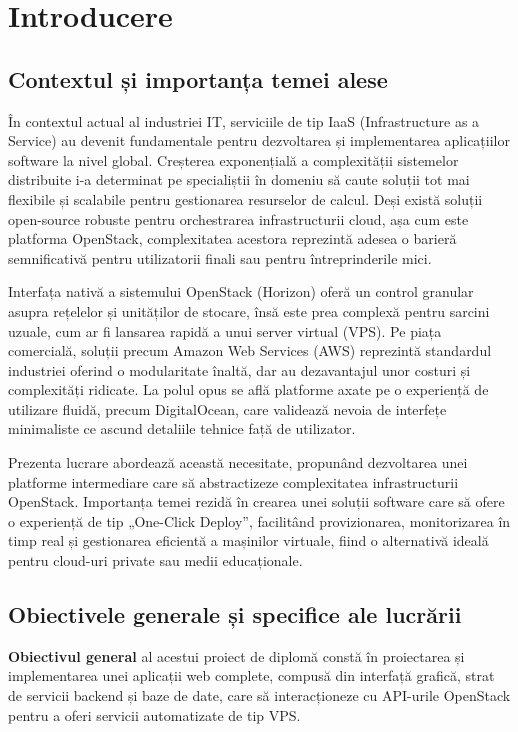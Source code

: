 \chapter{Introducere}
\label{cap:cap1}

\section{Contextul și importanța temei alese}

În contextul actual al industriei IT, serviciile de tip IaaS (Infrastructure as a Service) au devenit fundamentale pentru dezvoltarea și implementarea aplicațiilor software la nivel global. Creșterea exponențială a complexității sistemelor distribuite i-a determinat pe specialiștii în domeniu să caute soluții tot mai flexibile și scalabile pentru gestionarea resurselor de calcul. Deși există soluții open-source robuste pentru orchestrarea infrastructurii cloud, așa cum este platforma OpenStack, complexitatea acestora reprezintă adesea o barieră semnificativă pentru utilizatorii finali sau pentru întreprinderile mici.

Interfața nativă a sistemului OpenStack (Horizon) oferă un control granular asupra rețelelor și unităților de stocare, însă este prea complexă pentru sarcini uzuale, cum ar fi lansarea rapidă a unui server virtual (VPS). Pe piața comercială, soluții precum Amazon Web Services (AWS) reprezintă standardul industriei oferind o modularitate înaltă, dar au dezavantajul unor costuri și complexități ridicate. La polul opus se află platforme axate pe o experiență de utilizare fluidă, precum DigitalOcean, care validează nevoia de interfețe minimaliste ce ascund detaliile tehnice față de utilizator. 

Prezenta lucrare abordează această necesitate, propunând dezvoltarea unei platforme intermediare care să abstractizeze complexitatea infrastructurii OpenStack. Importanța temei rezidă în crearea unei soluții software care să ofere o experiență de tip „One-Click Deploy”, facilitând provizionarea, monitorizarea în timp real și gestionarea eficientă a mașinilor virtuale, fiind o alternativă ideală pentru cloud-uri private sau medii educaționale.

\section{Obiectivele generale și specifice ale lucrării}

\textbf{Obiectivul general} al acestui proiect de diplomă constă în proiectarea și implementarea unei aplicații web complete, compusă din interfață grafică, strat de servicii backend și baze de date, care să interacționeze cu API-urile OpenStack pentru a oferi servicii automatizate de tip VPS.

